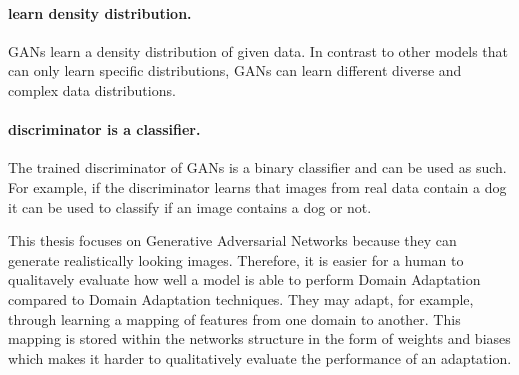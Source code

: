 \paragraph{learn density distribution.} GANs learn a density distribution of given data. In contrast to other models that can only learn specific distributions, GANs can learn different diverse and complex data distributions.

\paragraph{discriminator is a classifier.} The trained discriminator of GANs is a binary classifier and can be used as such. For example, if the discriminator learns that images from real data contain a dog it can be used to classify if an image contains a dog or not. 

This thesis focuses on Generative Adversarial Networks because they can generate realistically looking images. Therefore, it is easier for a human to qualitavely evaluate how well a model is able to perform Domain Adaptation compared to Domain Adaptation techniques. They may adapt, for example, through learning a mapping of features from one domain to another. This mapping is stored within the networks structure in the form of weights and biases which makes it harder to qualitatively evaluate the performance of an adaptation.